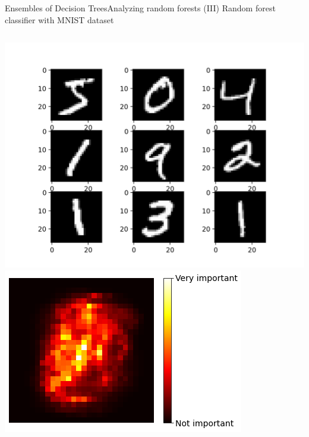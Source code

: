 \documentclass[10pt,compress]{beamer} %
\begin{document}
\begin{frame}{Ensembles of Decision Trees}{Analyzing random forests (III)}
    Random forest classifier with MNIST dataset\\
    \bigskip
    \begin{columns}
    \centering \includegraphics[width=\linewidth]{figs/mnist.png}
    \centering \includegraphics[width=\linewidth]{figs/forest-importance2.png}\\
    \end{columns}
\end{frame}
\end{document}
